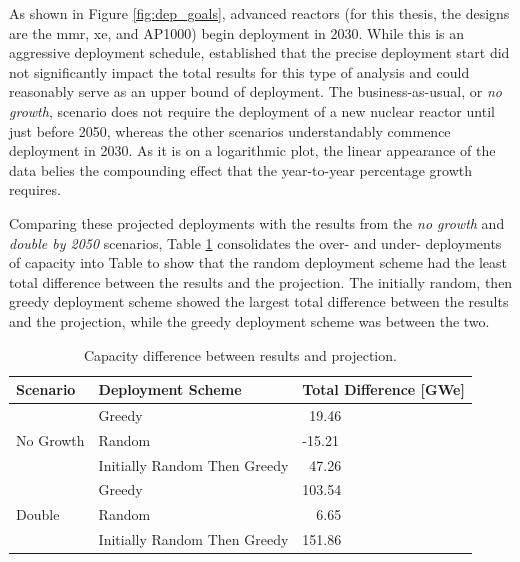 As shown in Figure \ref{fig:dep_goals}, advanced reactors (for this thesis, the designs are the \gls{mmr}, \gls{xe}, and AP1000) begin deployment in 2030. While this is an aggressive deployment schedule, \cite{bachmann_thesis_2023} established that the precise deployment start did not significantly impact the total results for this type of analysis and could reasonably serve as an upper bound of deployment. The business-as-usual, or \textit{no growth}, scenario does not require the deployment of a new nuclear reactor until just before 2050, whereas the other scenarios understandably commence deployment in 2030. As it is on a logarithmic plot, the linear appearance of the data belies the compounding effect that the year-to-year percentage growth requires.

Comparing these projected deployments with the results from the \textit{no growth} and \textit{double by 2050} scenarios, Table \ref{tab:cap_diff} consolidates the over- and under- deployments of capacity into Table to show that the random deployment scheme had the least total difference between the results and the projection. The initially random, then greedy deployment scheme showed the largest total difference between the results and the projection, while the greedy deployment scheme was between the two.

\begin{table}[H]
    \centering
    \caption{Capacity difference between results and projection.}
    \label{tab:cap_diff}
    \begin{tabular}{l l l}
        \hline
        \textbf{Scenario} & \textbf{Deployment Scheme} & \textbf{Total Difference [GWe]}\\
        \hline
        \multirow{3}{*}{No Growth} & Greedy & \textcolor{white}{0}19.46 \\
        & Random & -15.21 \\
        & Initially Random Then Greedy & \textcolor{white}{0}47.26 \\
        \hline
        \multirow{3}{*}{Double} & Greedy & 103.54 \\
        & Random & \textcolor{white}{00}6.65 \\
        & Initially Random Then Greedy & 151.86 \\
        \hline
    \end{tabular}
\end{table}

